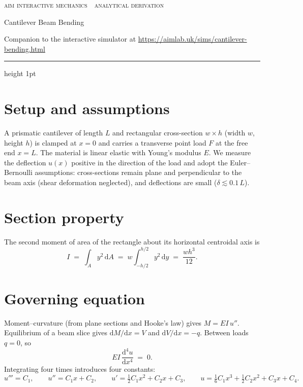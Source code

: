 \documentclass[10pt,a4paper]{article}
\begin{document}
{\footnotesize\textcolor{celdark}{\textsc{aim interactive mechanics \,\textperiodcentered\, analytical derivation}}}

{\LARGE Cantilever Beam Bending}

\textcolor{celdark}{\small Companion to the interactive simulator at
\url{https://aimlab.uk/sims/cantilever-bending.html}}

\medskip
{\color{celline}\hrule height 1pt}

\section*{Setup and assumptions}
A prismatic cantilever of length $L$ and rectangular cross-section $w \times h$
(width $w$, height $h$) is clamped at $x = 0$ and carries a transverse point load
$F$ at the free end $x = L$. The material is linear elastic with Young's modulus
$E$. We measure the deflection $u(x)$ positive in the direction of the load and
adopt the Euler--Bernoulli assumptions: cross-sections remain plane and
perpendicular to the beam axis (shear deformation neglected), and deflections are
small ($\delta \lesssim 0.1\,L$).

\section*{Section property}
The second moment of area of the rectangle about its horizontal centroidal axis is
\begin{equation}
I \;=\; \int_A y^2 \,\mathrm{d}A \;=\; w \int_{-h/2}^{h/2} y^2 \,\mathrm{d}y
\;=\; \frac{w h^3}{12}.
\end{equation}

\section*{Governing equation}
Moment--curvature (from plane sections and Hooke's law) gives $M = EI\,u''$.
Equilibrium of a beam slice gives $\mathrm{d}M/\mathrm{d}x = V$ and
$\mathrm{d}V/\mathrm{d}x = -q$. Between loads $q = 0$, so
\begin{equation}
EI \,\frac{\mathrm{d}^4 u}{\mathrm{d}x^4} \;=\; 0 .
\end{equation}
Integrating four times introduces four constants:
\begin{equation}
u''' = C_1, \qquad
u'' = C_1 x + C_2, \qquad
u' = \tfrac{1}{2}C_1 x^2 + C_2 x + C_3, \qquad
u = \tfrac{1}{6}C_1 x^3 + \tfrac{1}{2}C_2 x^2 + C_3 x + C_4 .
\end{equation}
\end{document}
